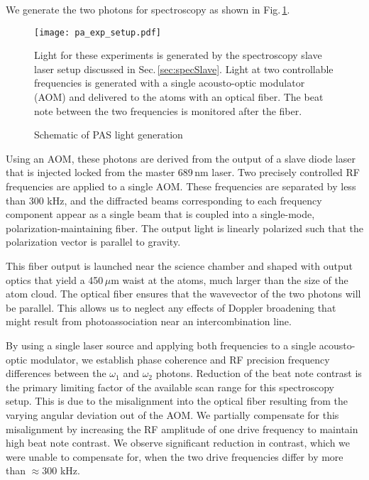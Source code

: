 We generate the two photons for spectroscopy as shown in Fig.\,\ref{fig:pas_light_gen}.
	\begin{figure} 
		\centerline{
		\texttt{[image: pa\_exp\_setup.pdf]}}
		\caption{Schematic of PAS light generation}{Light for these experiments is generated by the spectroscopy slave laser setup discussed in Sec.\,\ref{sec:specSlave}. Light at two controllable frequencies is generated with a single acousto-optic modulator (AOM) and delivered to the atoms with an optical fiber. The beat note between the two frequencies is monitored after the fiber.}
		\label{fig:pas_light_gen}
	\end{figure} 
Using an AOM, these photons are derived from the output of a slave diode laser that is injected locked from the master 689\,nm laser.
Two precisely controlled RF frequencies are applied to a single AOM.
These frequencies are separated by less than 300 kHz, and the diffracted beams corresponding to each frequency component appear as a single beam that is coupled into a single-mode, polarization-maintaining fiber.
The output light is linearly polarized such that the polarization vector is parallel to gravity.

This fiber output is launched near the science chamber and shaped with output optics that yield a 450\,$\mu$m waist at the atoms, much larger than the size of the atom cloud.
The optical fiber ensures that the wavevector of the two photons will be parallel.
This allows us to neglect any effects of Doppler broadening that might result from photoassociation near an intercombination line.

By using a single laser source and applying both frequencies to a single acousto-optic modulator, we establish phase coherence and RF precision frequency differences between the $\omega_1$ and $\omega_2$ photons.
Reduction of the beat note contrast is the primary limiting factor of the available scan range for this spectroscopy setup.
This is due to the misalignment into the optical fiber resulting from the varying angular deviation out of the AOM.
We partially compensate for this misalignment by increasing the RF amplitude of one drive frequency to maintain high beat note contrast.
We observe significant reduction in contrast, which we were unable to compensate for, when the two drive frequencies differ by more than $\approx$300 kHz. 

